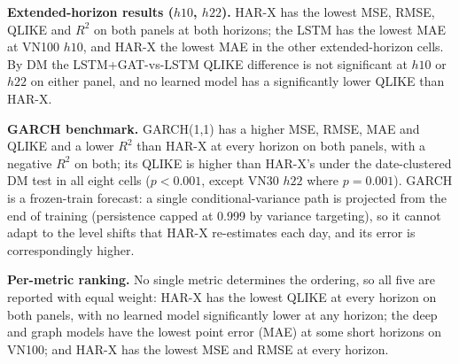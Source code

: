 \documentclass[runningheads]{llncs}
\begin{document}
\textbf{Extended-horizon results ($h10$, $h22$).} HAR-X has the lowest MSE, RMSE, QLIKE and $R^2$ on both
panels at both horizons; the LSTM has the lowest MAE at VN100 $h10$, and HAR-X the lowest MAE in the other
extended-horizon cells. By DM the LSTM+GAT-vs-LSTM QLIKE difference is not significant at $h10$ or $h22$ on
either panel, and no learned model has a significantly lower QLIKE than HAR-X.

\textbf{GARCH benchmark.} GARCH(1,1) has a higher MSE, RMSE, MAE and QLIKE and a lower $R^2$ than HAR-X at
every horizon on both panels, with a negative $R^2$ on both; its QLIKE is higher than HAR-X's under the
date-clustered DM test in all eight cells ($p<0.001$, except VN30 $h22$ where $p=0.001$). GARCH is a frozen-train forecast: a single conditional-variance path is projected from the end of training (persistence capped at 0.999 by variance targeting), so it cannot adapt to the level shifts that HAR-X re-estimates each day, and its error is correspondingly higher.

\textbf{Per-metric ranking.} No single metric determines the ordering, so all five are reported with equal
weight: HAR-X has the lowest QLIKE at every horizon on both panels, with no learned model significantly lower
at any horizon; the deep and graph models have the lowest point error (MAE) at some short horizons on VN100;
and HAR-X has the lowest MSE and RMSE at every horizon.
\end{document}
